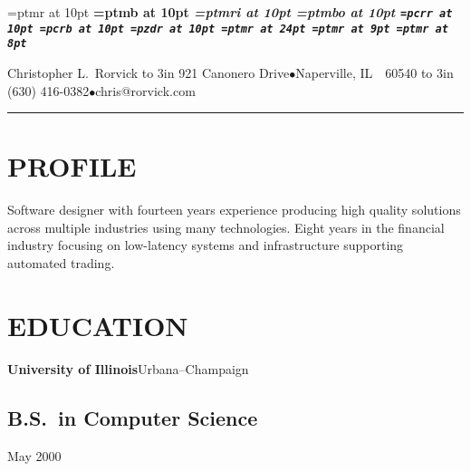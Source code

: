 
\pdfpagewidth 8.5in
\pdfpageheight 11in
\pdfhorigin 1in
\pdfvorigin 1in

\nopagenumbers
\parindent=0pt

\font\rm=ptmr at 10pt
\font\bf=ptmb at 10pt
\font\it=ptmri at 10pt
\font\sl=ptmbo at 10pt
\font\tt=pcrr at 10pt
\font\tb=pcrb at 10pt
\font\zdb=pzdr at 10pt
\font\lgrm=ptmr at 24pt
\font\smrm=ptmr at 9pt
\font\superrm=ptmr at 8pt

\def\super#1{\lower -.5ex \hbox{\superrm #1}}
\def\xmrk{{\zdb 4}}

\rm

{\lgrm Christopher L.~Rorvick\hfill\vbox{\smrm
\hbox to 3in {\hfil
921 Canonero Drive\quad $\bullet$\quad Naperville, IL~~60540}
\hbox to 3in {\hfil
(630) 416-0382\quad $\bullet$\quad chris@rorvick.com}
}}

\vskip 5pt \hrule \vskip 10pt

\long{}
\long{}
\long{}
\def\bulleted#1#2{\setbox0=\hbox{#1\ }\hangindent=\wd0#1 #2}


\section{PROFILE}{%
Software designer with fourteen years experience producing high quality
solutions across multiple industries using many technologies.
Eight years in the financial industry focusing on low-latency systems
and infrastructure supporting automated trading.
}

\section{EDUCATION}{%
{\bf University of Illinois}\quad Urbana--Champaign\par
\subsection{B.S.~in Computer Science}
    {May 2000}
}

